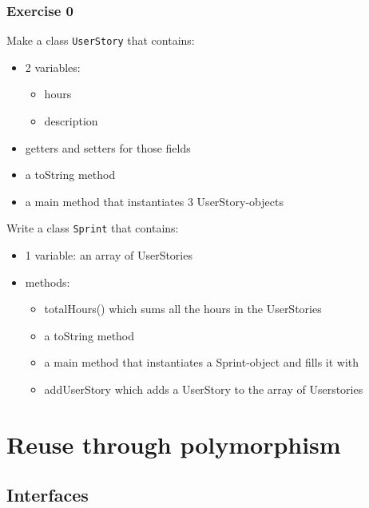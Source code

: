\subsection{Exercise 0}     
\begin{myprop}
Make a class \texttt{UserStory} that contains:
                \begin{itemize}
                    \item 2 variables:
                        \begin{itemize}
                            \item hours
                            \item description
                        \end{itemize}

                        \item getters and setters for those fields
                        \item a toString method
                        \item a main method that instantiates 3 UserStory-objects
                    \end{itemize}

Write a class \texttt{Sprint} that contains:
                 \begin{itemize}
                    \item 1 variable: an array of UserStories
                    \item methods:
                    \begin{itemize}
                        \item totalHours() which sums all the hours in the UserStories
                        \item a toString method
                        \item a main method that instantiates a Sprint-object and fills it with
                        \item addUserStory which adds a UserStory to the array of Userstories
                \end{itemize}
            \end{itemize}
\end{myprop}
\chapter{Reuse through polymorphism}

    \section{Interfaces}	    
